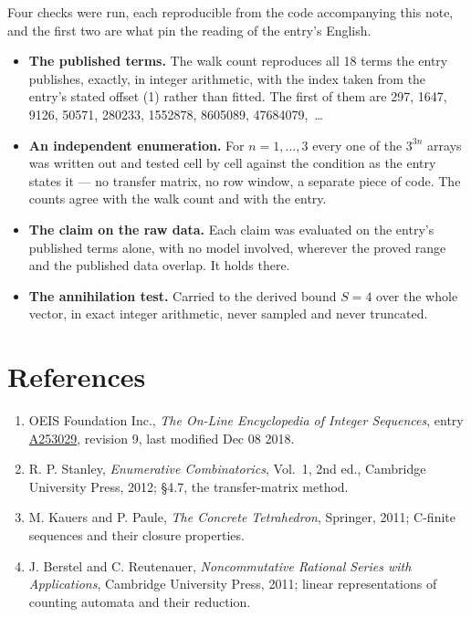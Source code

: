 \documentclass[11pt]{article}
\theoremstyle{definition}
\begin{document}
Four checks were run, each reproducible from the code accompanying this note, and the first two are what pin the reading of the entry's English.

\begin{itemize}

\item {\bfseries The published terms.} The walk count reproduces all 18 terms the entry publishes, exactly, in integer arithmetic, with the index taken from the entry's stated offset (1) rather than fitted. The first of them are 297, 1647, 9126, 50571, 280233, 1552878, 8605089, 47684079,~\dots

\item {\bfseries An independent enumeration.} For $n = 1,\dots,3$ every one of the $3^{3n}$ arrays was written out and tested cell by cell against the condition as the entry states it --- no transfer matrix, no row window, a separate piece of code. The counts agree with the walk count and with the entry.

\item {\bfseries The claim on the raw data.} Each claim was evaluated on the entry's published terms alone, with no model involved, wherever the proved range and the published data overlap. It holds there.

\item {\bfseries The annihilation test.} Carried to the derived bound $S = 4$ over the whole vector, in exact integer arithmetic, never sampled and never truncated.

\end{itemize}

\section{References}

\begin{enumerate}

\item OEIS Foundation Inc., \emph{The On-Line Encyclopedia of Integer Sequences}, entry \href{https://oeis.org/A253029}{A253029}, revision 9, last modified Dec 08 2018.

\item R. P. Stanley, \emph{Enumerative Combinatorics}, Vol.~1, 2nd ed., Cambridge University Press, 2012; \S4.7, the transfer-matrix method.

\item M. Kauers and P. Paule, \emph{The Concrete Tetrahedron}, Springer, 2011; C-finite sequences and their closure properties.

\item J. Berstel and C. Reutenauer, \emph{Noncommutative Rational Series with Applications}, Cambridge University Press, 2011; linear representations of counting automata and their reduction.

\end{enumerate}
\end{document}
